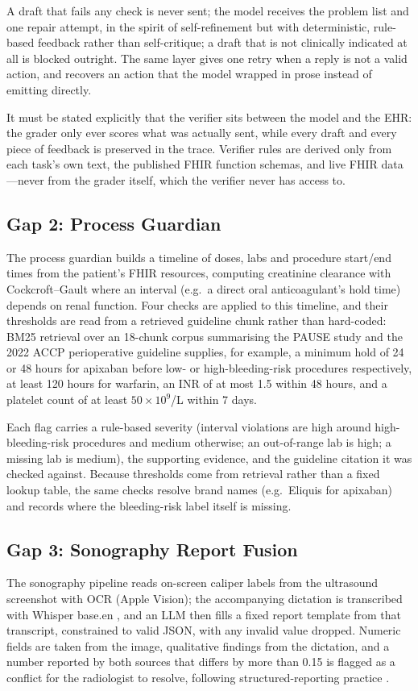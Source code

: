 \documentclass[conference]{IEEEtran}
\begin{document}
A draft that fails any check is never sent; the model receives the problem list and one repair attempt, in the spirit of self-refinement \cite{madaan2023selfrefine} but with deterministic, rule-based feedback rather than self-critique; a draft that is not clinically indicated at all is blocked outright. The same layer gives one retry when a reply is not a valid action, and recovers an action that the model wrapped in prose instead of emitting directly.

It must be stated explicitly that the verifier sits between the model and the EHR: the grader only ever scores what was actually sent, while every draft and every piece of feedback is preserved in the trace. Verifier rules are derived only from each task's own text, the published FHIR function schemas, and live FHIR data---never from the grader itself, which the verifier never has access to.

\subsection{Gap 2: Process Guardian}
The process guardian builds a timeline of doses, labs and procedure start/end times from the patient's FHIR resources, computing creatinine clearance with Cockcroft--Gault \cite{cockcroft1976crcl} where an interval (e.g.\ a direct oral anticoagulant's hold time) depends on renal function. Four checks are applied to this timeline, and their thresholds are read from a retrieved guideline chunk rather than hard-coded: BM25 retrieval \cite{robertson2009bm25} over an 18-chunk corpus summarising the PAUSE study \cite{douketis2019pause} and the 2022 ACCP perioperative guideline \cite{douketis2022accp} supplies, for example, a minimum hold of 24 or 48 hours for apixaban before low- or high-bleeding-risk procedures respectively, at least 120 hours for warfarin, an INR of at most 1.5 within 48 hours, and a platelet count of at least $50\times10^{9}$/L within 7 days.

Each flag carries a rule-based severity (interval violations are high around high-bleeding-risk procedures and medium otherwise; an out-of-range lab is high; a missing lab is medium), the supporting evidence, and the guideline citation it was checked against. Because thresholds come from retrieval rather than a fixed lookup table, the same checks resolve brand names (e.g.\ Eliquis for apixaban) and records where the bleeding-risk label itself is missing.

\subsection{Gap 3: Sonography Report Fusion}
The sonography pipeline reads on-screen caliper labels from the ultrasound screenshot with OCR (Apple Vision); the accompanying dictation is transcribed with Whisper base.en \cite{radford2023whisper}, and an LLM then fills a fixed report template from that transcript, constrained to valid JSON, with any invalid value dropped. Numeric fields are taken from the image, qualitative findings from the dictation, and a number reported by both sources that differs by more than 0.15 is flagged as a conflict for the radiologist to resolve, following structured-reporting practice \cite{esr2018structured}.
\end{document}
